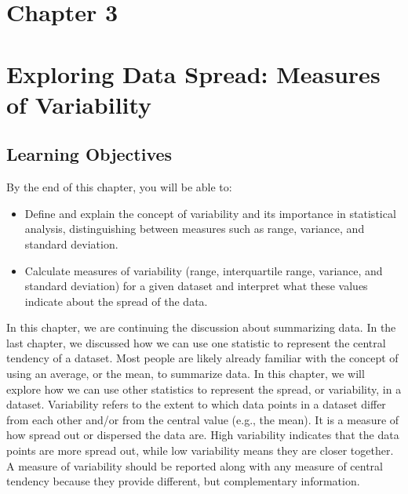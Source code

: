 \documentclass[
  letterpaper,
  DIV=11,
  numbers=noendperiod]{scrreprt}
\begin{document}

\chapter{Chapter 3}\label{chapter-3}


\chapter*{Exploring Data Spread: Measures of
Variability}\label{exploring-data-spread-measures-of-variability}


\section*{Learning Objectives}\label{learning-objectives-2}


By the end of this chapter, you will be able to:

\begin{itemize}
\item
  Define and explain the concept of variability and its importance in
  statistical analysis, distinguishing between measures such as range,
  variance, and standard deviation.
\item
  Calculate measures of variability (range, interquartile range,
  variance, and standard deviation) for a given dataset and interpret
  what these values indicate about the spread of the data.
\end{itemize}

In this chapter, we are continuing the discussion about summarizing
data. In the last chapter, we discussed how we can use one statistic to
represent the central tendency of a dataset. Most people are likely
already familiar with the concept of using an average, or the mean, to
summarize data. In this chapter, we will explore how we can use other
statistics to represent the spread, or variability, in a dataset.
Variability refers to the extent to which data points in a dataset
differ from each other and/or from the central value (e.g., the mean).
It is a measure of how spread out or dispersed the data are. High
variability indicates that the data points are more spread out, while
low variability means they are closer together. A measure of variability
should be reported along with any measure of central tendency because
they provide different, but complementary information.
\end{document}
